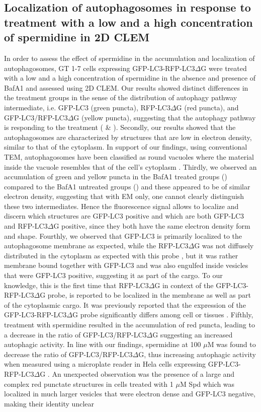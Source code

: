 \subsection{Localization of autophagosomes in response to treatment with a low and a high concentration of spermidine in 2D CLEM}
In order to assess the effect of spermidine in the accumulation and localization of autophagosomes, GT 1-7 cells expressing GFP-LC3-RFP-LC3$\Delta$G were treated with a low and a high concentration of spermidine in the absence and presence of BafA1 and assessed using 2D CLEM. Our results showed distinct differences in the treatment groups in the sense of the distribution of autophagy pathway intermediate, i.e. GFP-LC3 (green puncta), RFP-LC3$\Delta$G (red puncta), and GFP-LC3/RFP-LC3$\Delta$G (yellow puncta), suggesting that the autophagy pathway is responding to the treatment ( \& ). Secondly, our results showed that the autophagosomes are characterized by structures that are low in electron density, similar to that of the cytoplasm. In support of our findings, using conventional TEM, autophagosomes have been classified as round vacuoles where the material inside the vacuole resembles that of the cell’s cytoplasm \citep{Eskelinen2008}. Thirdly, we observed an accumulation of green and yellow puncta in the BafA1 treated groups () compared to the BafA1 untreated groups () and these appeared to be of similar electron density, suggesting that with EM only, one cannot clearly distinguish these two intermediates. Hence the fluorescence signal allows to localize and discern which structures are GFP-LC3 positive and which are both GFP-LC3 and RFP-LC3$\Delta$G positive, since they both have the same electron density form and shape. Fourthly, we observed that GFP-LC3 is primarily localized to the autophagosome membrane as expected, while the RFP-LC3$\Delta$G was not diffusely distributed in the cytoplasm as expected with this probe \citep{Kaizuka2016}, but it was rather membrane bound together with GFP-LC3 and was also engulfed inside vesicles that were GFP-LC3 positive, suggesting it as part of the cargo. To our knowledge, this is the first time that RFP-LC3$\Delta$G in context of the GFP-LC3-RFP-LC3$\Delta$G probe, is reported to be localized in the membrane as well as part of the cytoplasmic cargo. It was previously reported that the expression of the GFP-LC3-RFP-LC3$\Delta$G probe significantly differs among cell or tissues \citep{MoulisandVindis2017}. Fifthly, treatment with spermidine resulted in the accumulation of red puncta, leading to a decrease in the ratio of GFP-LC3/RFP-LC3$\Delta$G suggesting an increased autophagic activity. In line with our findings, spermidine at 100 $\mu$M was found to decrease the ratio of GFP-LC3/RFP-LC3$\Delta$G, thus increasing autophagic activity when measured using a microplate reader in Hela cells expressing GFP-LC3-RFP-LC3$\Delta$G \citep{Kaizuka2016}. An unexpected observation was the presence of a large and complex red punctate structures in cells treated with 1 $\mu$M Spd which was localized in much larger vesicles that were electron dense and GFP-LC3 negative, making their identity unclear 